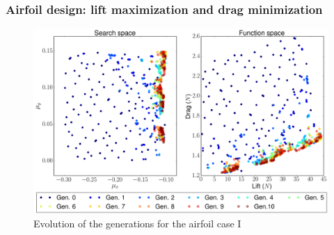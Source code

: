 \newpage

\subsubsection*{Airfoil design: lift maximization and drag minimization}

     \begin{figure}[h!]
        \centering
        \small
        \includegraphics[width=\textwidth, height=0.4\textheight]{Figures/4/cLcDgen10.png}
        \caption{Evolution of the generations for the airfoil case I}
        \label{fig:genForCLCD}
    \end{figure}


